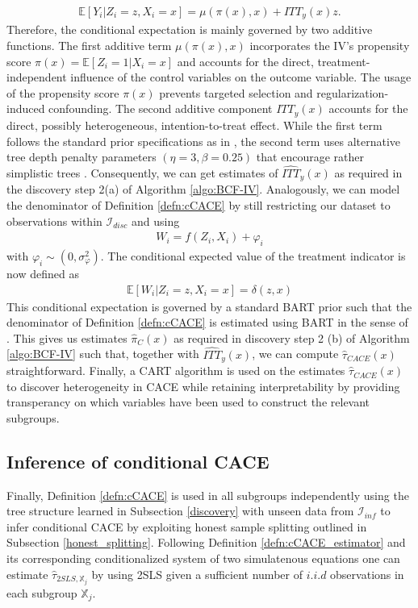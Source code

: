 \begin{align*}
    \mathbb{E}\left[Y_i | Z_i = z, X_i=x \right] = \mu\left(\pi(x), x\right) + ITT_y(x)z. 
\end{align*}
Therefore, the conditional expectation is mainly governed by two additive functions. 
The first additive term $\mu\left(\pi(x), x\right)$ incorporates the IV's propensity score $\pi(x)=\mathbb{E}[Z_i=1 | X_i=x]$ and accounts for the direct, treatment-independent influence of the control variables on the outcome variable. 
The usage of the propensity score $\pi(x)$ prevents targeted selection and regularization-induced confounding. 
The second additive component $ITT_y(x)$ accounts for the direct, possibly heterogeneous, intention-to-treat effect. 
While the first term follows the standard prior specifications as in \cite{chipman_bart_2010}, the second term uses alternative tree depth penalty parameters $(\eta = 3, \beta=0.25)$ that encourage rather simplistic trees \cite{hahn_bayesian_2020}.
Consequently, we can get estimates of $\widehat{ITT}_y(x)$ as required in the discovery step 2(a) of Algorithm \ref{algo:BCF-IV}.
Analogously, we can model the denominator of Definition \ref{defn:cCACE} by still restricting our dataset to observations within $\mathcal{I}_{disc}$ and using
\begin{align*}
    W_i = f(Z_i, X_i) + \varphi_i 
\end{align*}
with $\varphi_i \sim \left(0, \sigma_{\varphi}^2\right)$. The conditional expected value of the treatment indicator is now defined as       
\begin{align*}
    \mathbb{E}\left[W_i | Z_i = z, X_i=x \right] = \delta(z, x)
\end{align*}
This conditional expectation is governed by a standard BART prior such that the denominator of Definition \ref{defn:cCACE} is estimated using BART in the sense of \cite{Hill_2011}. This gives us estimates $\widehat{\pi}_{C}(x)$ as required in discovery step 2 (b) of Algorithm \ref{algo:BCF-IV} such that, together with $\widehat{ITT}_y(x)$, we can compute $\widehat\tau_{CACE}(x)$ straightforward.
Finally, a CART algorithm is used on the estimates $\widehat\tau_{CACE}(x)$ to discover heterogeneity in CACE while retaining interpretability by providing transperancy on which variables have been used to construct the relevant subgroups. 

\subsection{Inference of conditional CACE}
\label{inference}
Finally, Definition \ref{defn:cCACE} is used in all subgroups independently using the tree structure learned in Subsection \ref{discovery} with unseen data from $\mathcal{I}_{inf}$ to infer conditional CACE by exploiting honest sample splitting outlined in Subsection \ref{honest_splitting}.
Following Definition \ref{defn:cCACE_estimator} and its corresponding conditionalized system of two simulatenous equations one can estimate $\widehat{\tau}_{2SLS, \mathbb{X}_j}$ by using 2SLS given a sufficient number of $i.i.d$ observations in each subgroup $\mathbb{X}_j$.  




